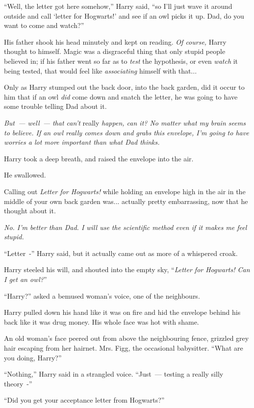 ``Well, the letter got here somehow,'' Harry said, ``so I'll just wave it around outside and call `letter for Hogwarts!' and see if an owl picks it up. Dad, do you want to come and watch?''

His father shook his head minutely and kept on reading. \emph{Of course,} Harry thought to himself. Magic was a disgraceful thing that only stupid people believed in; if his father went so far as to \emph{test} the hypothesis, or even \emph{watch} it being tested, that would feel like \emph{associating} himself with that...

Only as Harry stumped out the back door, into the back garden, did it occur to him that if an owl \emph{did} come down and snatch the letter, he was going to have some trouble telling Dad about it.

\emph{But~--- well~--- that can't} really \emph{happen, can it? No matter what my brain seems to believe. If an owl really comes down and grabs this envelope, I'm going to have worries a lot more important than what Dad thinks.}

Harry took a deep breath, and raised the envelope into the air.

He swallowed.

Calling out \emph{Letter for Hogwarts!} while holding an envelope high in the air in the middle of your own back garden was... actually pretty embarrassing, now that he thought about it.

\emph{No. I'm better than Dad. I will use the scientific method even if it makes me feel stupid.}

``Letter~-'' Harry said, but it actually came out as more of a whispered croak.

Harry steeled his will, and shouted into the empty sky, ``\emph{Letter for Hogwarts! Can I get an owl?}''

``Harry?'' asked a bemused woman's voice, one of the neighbours.

Harry pulled down his hand like it was on fire and hid the envelope behind his back like it was drug money. His whole face was hot with shame.

An old woman's face peered out from above the neighbouring fence, grizzled grey hair escaping from her hairnet. Mrs. Figg, the occasional babysitter. ``What are you doing, Harry?''

``Nothing,'' Harry said in a strangled voice. ``Just~--- testing a really silly theory~-''

``Did you get your acceptance letter from Hogwarts?''

